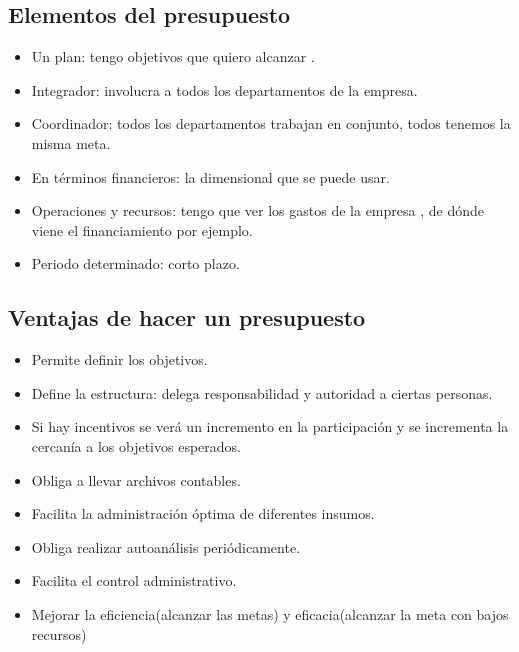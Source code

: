 \subsection{Elementos del presupuesto}
\begin{itemize}
    \item Un plan: tengo objetivos que quiero alcanzar .
    \item Integrador: involucra a todos los departamentos de la empresa.
    \item Coordinador: todos los departamentos trabajan en conjunto, todos tenemos la misma meta.
    \item En términos financieros: la dimensional que se puede usar.
    \item Operaciones y recursos: tengo que ver los gastos de la empresa , de dónde viene el financiamiento por ejemplo.
    \item Periodo determinado: corto plazo. 
\end{itemize}


\subsection{Ventajas de hacer un presupuesto}
\begin{itemize}
    \item Permite definir los objetivos.
    \item Define la estructura: delega responsabilidad y autoridad a ciertas personas.
    \item Si hay incentivos se verá un incremento en la participación y se incrementa la cercanía a los objetivos esperados.
    \item Obliga a llevar archivos contables.
    \item Facilita la administración óptima de diferentes insumos.
    \item Obliga realizar autoanálisis periódicamente.
    \item Facilita el control administrativo.
    \item Mejorar la eficiencia(alcanzar las metas) y eficacia(alcanzar la meta con bajos recursos)
\end{itemize}


